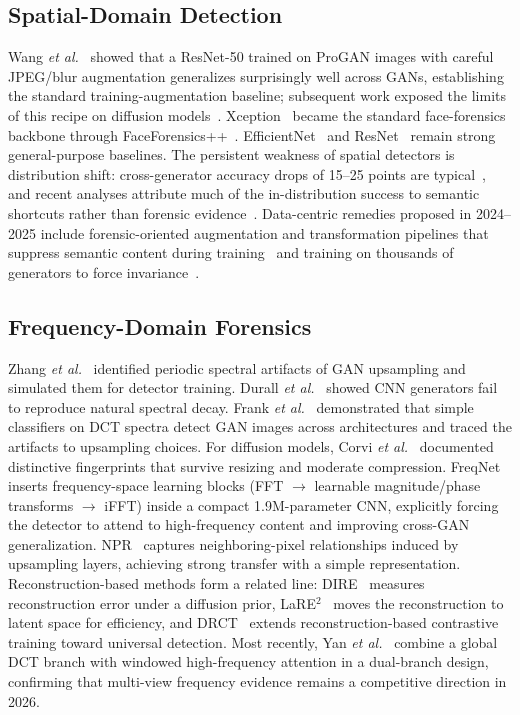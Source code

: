 \documentclass[journal]{IEEEtran}
\begin{document}
\subsection{Spatial-Domain Detection}
Wang \textit{et al.}~\cite{wang2020} showed that a ResNet-50 trained on ProGAN images with careful JPEG/blur augmentation generalizes surprisingly well across GANs, establishing the standard training-augmentation baseline; subsequent work exposed the limits of this recipe on diffusion models~\cite{corvi2023}. Xception~\cite{chollet2017} became the standard face-forensics backbone through FaceForensics++~\cite{rossler2019}. EfficientNet~\cite{tan2019} and ResNet~\cite{he2016} remain strong general-purpose baselines. The persistent weakness of spatial detectors is distribution shift: cross-generator accuracy drops of 15--25 points are typical~\cite{ojha2023,zhu2023genimage}, and recent analyses attribute much of the in-distribution success to semantic shortcuts rather than forensic evidence~\cite{yan2025sanity,shuai2026shortcuts}. Data-centric remedies proposed in 2024--2025 include forensic-oriented augmentation and transformation pipelines that suppress semantic content during training~\cite{li2025safe} and training on thousands of generators to force invariance~\cite{park2025community}.

\subsection{Frequency-Domain Forensics}
Zhang \textit{et al.}~\cite{zhang2019wifs} identified periodic spectral artifacts of GAN upsampling and simulated them for detector training. Durall \textit{et al.}~\cite{durall2020} showed CNN generators fail to reproduce natural spectral decay. Frank \textit{et al.}~\cite{frank2020} demonstrated that simple classifiers on DCT spectra detect GAN images across architectures and traced the artifacts to upsampling choices. For diffusion models, Corvi \textit{et al.}~\cite{corvi2023} documented distinctive fingerprints that survive resizing and moderate compression. FreqNet~\cite{tan2024freqnet} inserts frequency-space learning blocks (FFT $\rightarrow$ learnable magnitude/phase transforms $\rightarrow$ iFFT) inside a compact 1.9M-parameter CNN, explicitly forcing the detector to attend to high-frequency content and improving cross-GAN generalization. NPR~\cite{tan2024npr} captures neighboring-pixel relationships induced by upsampling layers, achieving strong transfer with a simple representation. Reconstruction-based methods form a related line: DIRE~\cite{wang2023dire} measures reconstruction error under a diffusion prior, LaRE$^2$~\cite{luo2024lare} moves the reconstruction to latent space for efficiency, and DRCT~\cite{chen2024drct} extends reconstruction-based contrastive training toward universal detection. Most recently, Yan \textit{et al.}~\cite{yan2026dualfreq} combine a global DCT branch with windowed high-frequency attention in a dual-branch design, confirming that multi-view frequency evidence remains a competitive direction in 2026.
\end{document}
